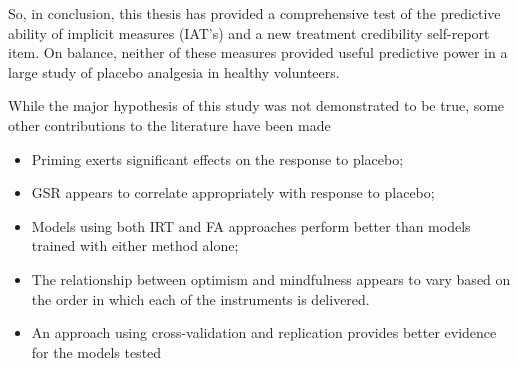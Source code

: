So, in conclusion, this thesis has provided a comprehensive test of
the predictive ability of implicit measures (IAT's) and a new
treatment credibility self-report item. On balance, neither of these
measures provided useful predictive power in a large study of placebo
analgesia in healthy volunteers.

While the major hypothesis of this study was not demonstrated to be
true, some other contributions to the literature have been made
\begin{itemize}
\item Priming exerts significant effects on the response to placebo;
\item GSR appears to correlate appropriately with response to placebo;
\item Models using both IRT and FA approaches perform better than
models trained with either method alone;
\item The relationship between optimism and mindfulness appears to
vary based on the order in which each of the instruments is delivered.
\item An approach using cross-validation and replication provides better evidence for the models tested
\end{itemize}

